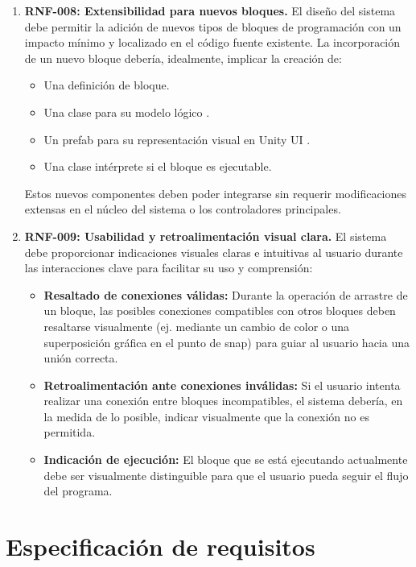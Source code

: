 \begin{enumerate}
	\\	
	\item \textbf{RNF-008: Extensibilidad para nuevos bloques.}
	El diseño del sistema debe permitir la adición de nuevos tipos de bloques de programación con un impacto mínimo y localizado en el código fuente existente. La incorporación de un nuevo bloque debería, idealmente, implicar la creación de:
	\begin{itemize}
		\item Una definición de bloque.
		\item Una clase para su modelo lógico .
		\item Un prefab para su representación visual en Unity UI .
		\item Una clase intérprete  si el bloque es ejecutable.
	\end{itemize}
	Estos nuevos componentes deben poder integrarse sin requerir modificaciones extensas en el núcleo del sistema o los controladores principales.
	\\
	\item \textbf{RNF-009: Usabilidad y retroalimentación visual clara.}
	El sistema debe proporcionar indicaciones visuales claras e intuitivas al usuario durante las interacciones clave para facilitar su uso y comprensión:
	\begin{itemize}
		\item \textbf{Resaltado de conexiones válidas:} Durante la operación de arrastre de un bloque, las posibles conexiones compatibles con otros bloques deben resaltarse visualmente (ej. mediante un cambio de color o una superposición gráfica en el punto de snap) para guiar al usuario hacia una unión correcta. 
		\item \textbf{Retroalimentación ante conexiones inválidas:}  Si el usuario intenta realizar una conexión entre bloques incompatibles, el sistema debería, en la medida de lo posible, indicar visualmente que la conexión no es permitida. \hfill 
		\item \textbf{Indicación de ejecución:} El bloque que se está ejecutando actualmente debe ser visualmente distinguible para que el usuario pueda seguir el flujo del programa. 
	\end{itemize}
	
\end{enumerate}

\section{Especificación de requisitos}


